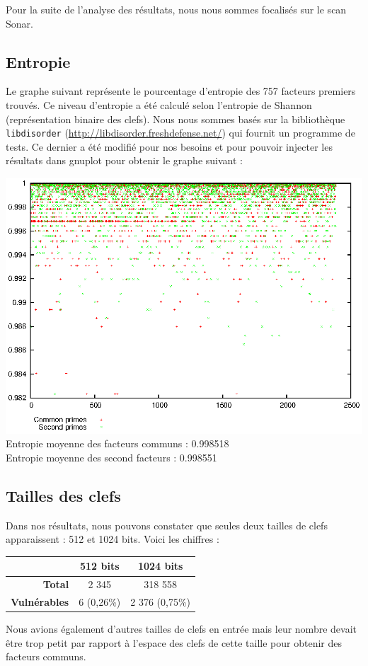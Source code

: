 \documentclass[a4paper,11pt,french]{article}
\begin{document}
Pour la suite de l'analyse des résultats, nous nous sommes focalisés sur le scan Sonar.

\subsection{Entropie}
Le graphe suivant représente le pourcentage d'entropie des 757 facteurs premiers trouvés. Ce niveau d'entropie a été calculé selon l'entropie de Shannon (représentation binaire des clefs). Nous nous sommes basés sur la bibliothèque \verb+libdisorder+ (\url{http://libdisorder.freshdefense.net/}) qui fournit un programme de tests. Ce dernier a été modifié pour nos besoins et pour pouvoir injecter les résultats dans gnuplot pour obtenir le graphe suivant :

\includegraphics[width=16cm]{entropyprimes.eps}
\\
Entropie moyenne des facteurs communs : 0.998518\\
Entropie moyenne des second facteurs : 0.998551\\

\subsection{Tailles des clefs}
Dans nos résultats, nous pouvons constater que seules deux tailles de clefs apparaissent : 512 et 1024 bits. Voici les chiffres :

\begin{center}
\begin{tabular}{|r|c|c|}
\hline
\textbf{}&\textbf{512 bits}&\textbf{1024 bits}\\
\hline
\textbf{Total}&2 345&318 558\\
\hline
\textbf{Vulnérables}&6 (0,26\%)&2 376 (0,75\%)\\
\hline
\end{tabular}
\end{center}

Nous avions également d'autres tailles de clefs en entrée mais leur nombre devait être trop petit par rapport à l'espace des clefs de cette taille pour obtenir des facteurs communs.
\end{document}
